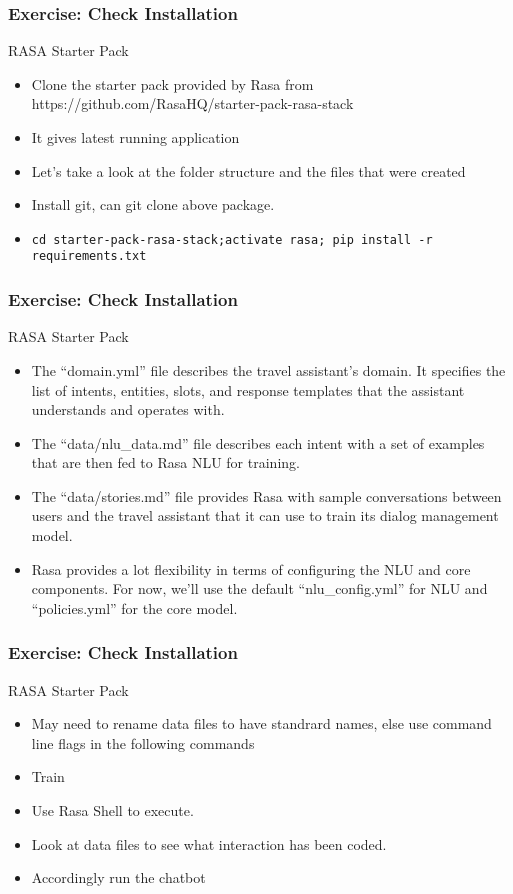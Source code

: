  \begin{frame}[fragile]\frametitle{Exercise: Check Installation}
RASA Starter Pack
\begin{itemize}
\item Clone the starter pack provided by Rasa from https://github.com/RasaHQ/starter-pack-rasa-stack
\item It gives latest running application
\item Let's take a look at the folder structure and the files that were created 
\item Install git, can git clone above package.
\item \lstinline|cd starter-pack-rasa-stack;activate rasa; pip install -r requirements.txt|

\end{itemize}
\end{frame}

 \begin{frame}[fragile]\frametitle{Exercise: Check Installation}
RASA Starter Pack
\begin{itemize}
\item The ``domain.yml'' file describes the travel assistant's domain. It specifies the list of intents, entities, slots, and response templates that the assistant understands and operates with.
\item The ``data/nlu\_data.md'' file describes each intent with a set of examples that are then fed to Rasa NLU for training.
\item The ``data/stories.md'' file provides Rasa with sample conversations between users and the travel assistant that it can use to train its dialog management model.
\item Rasa provides a lot flexibility in terms of configuring the NLU and core components. For now, we'll use the default ``nlu\_config.yml'' for NLU and ``policies.yml'' for the core model.
\end{itemize}


\end{frame}

 \begin{frame}[fragile]\frametitle{Exercise: Check Installation}
RASA Starter Pack
\begin{itemize}
\item May need to rename data files to have standrard names, else use command line flags in the following commands
\item Train
\item Use Rasa Shell to execute.
\item Look at data files to see what interaction has been coded.
\item Accordingly run the chatbot
\end{itemize}


\end{frame}


